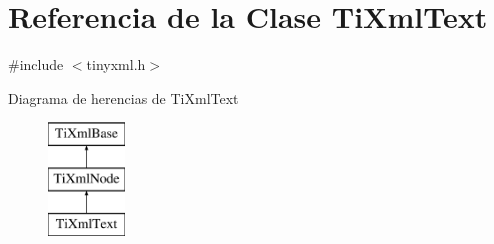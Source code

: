 \hypertarget{class_ti_xml_text}{\section{Referencia de la Clase Ti\-Xml\-Text}
\label{class_ti_xml_text}
}


{\ttfamily \#include $<$tinyxml.\-h$>$}

Diagrama de herencias de Ti\-Xml\-Text\begin{figure}[H]
\begin{center}
\leavevmode
\includegraphics[height=3.000000cm]{class_ti_xml_text}
\end{center}
\end{figure}
